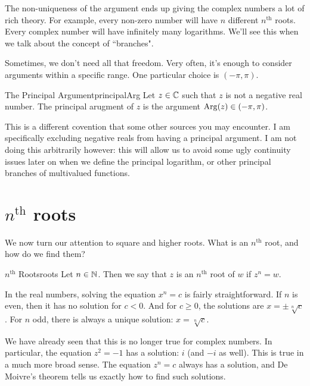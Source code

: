 The non-uniqueness of the argument ends up giving the complex numbers a lot of rich theory. For example, every non-zero number will have $n$ different $n^{\text{th}}$ roots. Every complex number will have infinitely many logarithms. We'll see this when we talk about the concept of ``branches".

Sometimes, we don't need all that freedom. Very often, it's enough to consider arguments within a specific range. One particular choice is $(-\pi,\pi)$.

\begin{defbo}{The Principal Argument}{principalArg}
Let $z\in \mathbb{C}$ such that $z$ is not a negative real number. The principal arugment of $z$ is the argument $\mathrm{Arg}(z) \in (-\pi,\pi)$.
\end{defbo}

\begin{note} This is a different covention that some other sources you may encounter. I am specifically excluding negative reals from having a principal argument. I am not doing this arbitrarily however: this will allow us to avoid some ugly continuity issues later on when we define the principal logarithm, or other principal branches of multivalued functions.\end{note}


\section{$n^{\text{th}}$ roots}

We now turn our attention to square and higher roots. What is an $n^{\text{th}}$ root, and how do we find them?

\begin{defbo}{$n^{\text{th}}$ Roots}{roots}
Let $n\in\mathbb{N}$. Then we say that $z$ is an $n^{\text{th}}$ root of $w$ if $z^n = w$.
\end{defbo}

In the real numbers, solving the equation $x^n = c$ is fairly straightforward. If $n$ is even, then it has no solution for $c < 0$. And for $c \ge 0$, the solutions are $x = \pm\sqrt[n]{c}$. For $n$ odd, there is always a unique solution: $x = \sqrt[n]{c}$.

We have already seen that this is no longer true for complex numbers. In particular, the equation $z^2 = -1$ has a solution: $i$ (and $-i$ as well). This is true in a much more broad sense. The equation $z^n = c$ always has a solution, and De Moivre's theorem tells us exactly how to find such solutions.

